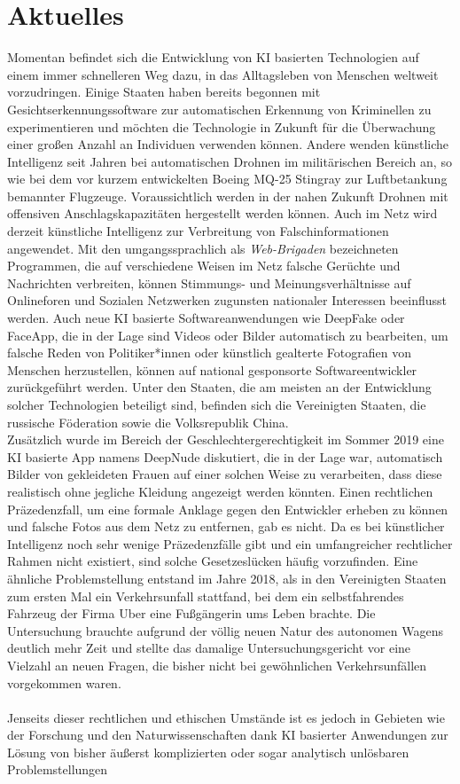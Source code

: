 \documentclass[a4paper,11pt]{article}
\begin{document}
    \section{Aktuelles}
   Momentan befindet sich die Entwicklung von KI basierten Technologien auf einem immer schnelleren Weg dazu, in das Alltagsleben von Menschen weltweit vorzudringen. Einige Staaten haben bereits begonnen mit Gesichtserkennungssoftware zur automatischen Erkennung von Kriminellen zu experimentieren und möchten die Technologie in Zukunft für die Überwachung einer großen Anzahl an Individuen verwenden können. Andere wenden künstliche Intelligenz seit Jahren bei automatischen Drohnen im militärischen Bereich an, so wie bei dem vor kurzem entwickelten Boeing MQ-25 Stingray zur Luftbetankung bemannter Flugzeuge. Voraussichtlich werden in der nahen Zukunft Drohnen mit offensiven Anschlagskapazitäten hergestellt werden können. Auch im Netz wird derzeit künstliche Intelligenz zur Verbreitung von Falschinformationen angewendet. Mit den umgangssprachlich als \textit{Web-Brigaden} bezeichneten Programmen, die auf verschiedene Weisen im Netz falsche Gerüchte und Nachrichten verbreiten, können Stimmungs- und Meinungsverhältnisse auf Onlineforen und Sozialen Netzwerken zugunsten nationaler Interessen beeinflusst werden. Auch neue KI basierte Softwareanwendungen wie DeepFake oder FaceApp, die in der Lage sind Videos oder Bilder automatisch zu bearbeiten, um falsche Reden von Politiker*innen oder künstlich gealterte Fotografien von Menschen herzustellen, können auf national gesponsorte Softwareentwickler zurückgeführt werden. Unter den Staaten, die am meisten an der Entwicklung solcher Technologien beteiligt sind, befinden sich die Vereinigten Staaten, die russische Föderation sowie die Volksrepublik China. \\ Zusätzlich wurde im Bereich der Geschlechtergerechtigkeit im Sommer 2019 eine KI basierte App namens DeepNude diskutiert, die in der Lage war, automatisch Bilder von gekleideten Frauen auf einer solchen Weise zu verarbeiten, dass diese realistisch ohne jegliche Kleidung angezeigt werden könnten. Einen rechtlichen Präzedenzfall, um eine formale Anklage gegen den Entwickler erheben zu können und falsche Fotos aus dem Netz zu entfernen, gab es nicht. Da es bei künstlicher Intelligenz noch sehr wenige Präzedenzfälle gibt und ein umfangreicher rechtlicher Rahmen nicht existiert, sind solche Gesetzeslücken häufig vorzufinden. Eine ähnliche Problemstellung entstand im Jahre 2018, als in den Vereinigten Staaten zum ersten Mal ein Verkehrsunfall stattfand, bei dem ein selbstfahrendes Fahrzeug der Firma Uber eine Fußgängerin ums Leben brachte. Die Untersuchung brauchte aufgrund der völlig neuen Natur des autonomen Wagens deutlich mehr Zeit und stellte das damalige Untersuchungsgericht vor eine Vielzahl an neuen Fragen, die bisher nicht bei gewöhnlichen Verkehrsunfällen vorgekommen waren. \\ \\ Jenseits dieser rechtlichen und ethischen Umstände ist es jedoch in Gebieten wie der Forschung und den Naturwissenschaften dank KI basierter Anwendungen zur Lösung von bisher äußerst komplizierten oder sogar analytisch unlösbaren Problemstellungen 
\end{document}
